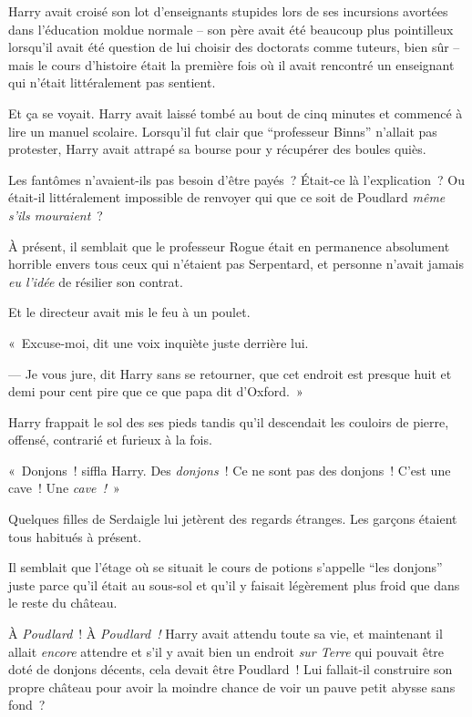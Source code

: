 Harry avait croisé son lot d'enseignants stupides lors de ses incursions avortées dans l'éducation moldue normale -- son père avait été beaucoup plus pointilleux lorsqu'il avait été question de lui choisir des doctorats comme tuteurs, bien sûr -- mais le cours d'histoire était la première fois où il avait rencontré un enseignant qui n'était littéralement pas sentient.

Et ça se voyait.
Harry avait laissé tombé au bout de cinq minutes et commencé à lire un manuel scolaire.
Lorsqu'il fut clair que “professeur Binns” n'allait pas protester, Harry avait attrapé sa bourse pour y récupérer des boules quiès.

Les fantômes n'avaient-ils pas besoin d'être payés~?
Était-ce là l'explication~?
Ou était-il littéralement impossible de renvoyer qui que ce soit de Poudlard \emph{même s'ils mouraient}~?

À présent, il semblait que le professeur Rogue était en permanence absolument horrible envers tous ceux qui n'étaient pas Serpentard, et personne n'avait jamais \emph{eu l'idée} de résilier son contrat.

Et le directeur avait mis le feu à un poulet.

«~Excuse-moi, dit une voix inquiète juste derrière lui.

--- Je vous jure, dit Harry sans se retourner, que cet endroit est presque huit et demi pour cent pire que ce que papa dit d'Oxford.~»

\later

Harry frappait le sol des ses pieds tandis qu'il descendait les couloirs de pierre, offensé, contrarié et furieux à la fois.

«~Donjons~! siffla Harry.
Des \emph{donjons}~!
Ce ne sont pas des donjons~!
C'est une cave~!
Une \emph{cave~!}~»

Quelques filles de Serdaigle lui jetèrent des regards étranges.
Les garçons étaient tous habitués à présent.

Il semblait que l'étage où se situait le cours de potions s'appelle “les donjons” juste parce qu'il était au sous-sol et qu'il y faisait légèrement plus froid que dans le reste du château.

À \emph{Poudlard}~!
À \emph{Poudlard~!} Harry avait attendu toute sa vie, et maintenant il allait \emph{encore} attendre et s'il y avait bien un endroit \emph{sur Terre} qui pouvait être doté de donjons décents, cela devait être Poudlard~!
Lui fallait-il construire son propre château pour avoir la moindre chance de voir un pauve petit abysse sans fond~?

